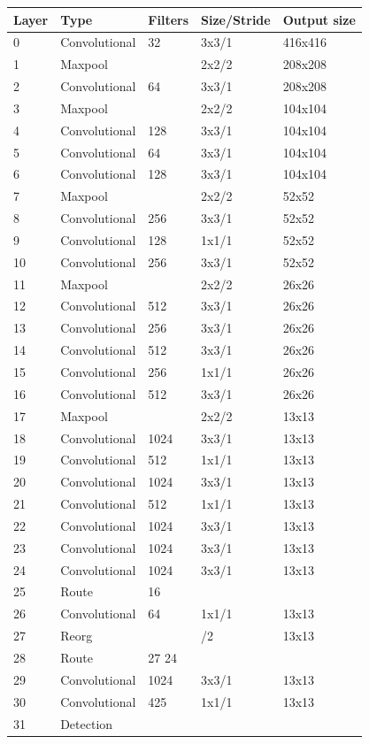 \begin{table}[htbp]
    \centering
    \begin{tabularx}{\textwidth}{| X | X | X | X | X |}
        \hline
        
Layer & Type & Filters & Size/Stride & Output size \\ \hline
0 &  Convolutional & 32   & 3x3/1 & 416x416\\ \hline
1 &  Maxpool       &      & 2x2/2 & 208x208\\ \hline
2 &  Convolutional & 64   & 3x3/1 & 208x208\\ \hline
3 &  Maxpool       &      & 2x2/2 & 104x104\\ \hline
4 &  Convolutional & 128  & 3x3/1 & 104x104\\ \hline
5 &  Convolutional & 64   & 3x3/1 & 104x104\\ \hline
6 &  Convolutional & 128  & 3x3/1 & 104x104\\ \hline
7 &  Maxpool       &      & 2x2/2 & 52x52\\ \hline
8 &  Convolutional & 256  & 3x3/1 & 52x52\\ \hline
9 &  Convolutional & 128  & 1x1/1 & 52x52\\ \hline
10 & Convolutional & 256  & 3x3/1 & 52x52\\ \hline
11 & Maxpool       &      & 2x2/2 & 26x26\\ \hline
12 & Convolutional & 512  & 3x3/1 & 26x26\\ \hline
13 & Convolutional & 256  & 3x3/1 & 26x26\\ \hline
14 & Convolutional & 512  & 3x3/1 & 26x26\\ \hline
15 & Convolutional & 256  & 1x1/1 & 26x26\\ \hline
16 & Convolutional & 512  & 3x3/1 & 26x26\\ \hline
17 & Maxpool       &      & 2x2/2 & 13x13\\ \hline
18 & Convolutional & 1024  &3x3/1 & 13x13\\ \hline
19 & Convolutional & 512  & 1x1/1 & 13x13\\ \hline
20 & Convolutional & 1024 & 3x3/1 & 13x13\\ \hline
21 & Convolutional & 512  & 1x1/1 & 13x13\\ \hline
22 & Convolutional & 1024 & 3x3/1 & 13x13\\ \hline
23 & Convolutional & 1024 & 3x3/1 & 13x13\\ \hline
24 & Convolutional & 1024 & 3x3/1 & 13x13\\ \hline
25 & Route         & 16	  &       &    \\ \hline
26 & Convolutional & 64   & 1x1/1 & 13x13\\ \hline
27 & Reorg	       &      & /2    & 13x13\\ \hline
28 & Route         & 27 24&       & \\ \hline
29 & Convolutional & 1024 & 3x3/1 & 13x13\\ \hline
30 & Convolutional & 425  & 1x1/1 & 13x13\\ \hline
31 & Detection     &      &       & \\ \hline
    \end{tabularx}
\end{table}
